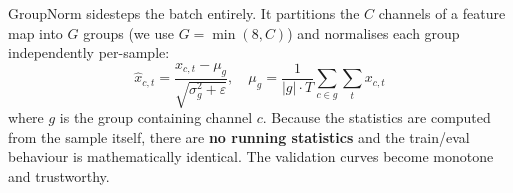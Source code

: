GroupNorm sidesteps the batch entirely. It partitions the $C$ channels of a feature map into $G$ groups (we use $G = \min(8, C)$) and normalises each group independently per-sample:
\begin{equation}
    \hat{x}_{c,t} = \frac{x_{c,t} - \mu_{g}}{\sqrt{\sigma_{g}^{2} + \varepsilon}}, \quad
    \mu_{g} = \frac{1}{|g| \cdot T} \sum_{c \in g} \sum_{t} x_{c,t}
\end{equation}
where $g$ is the group containing channel $c$. Because the statistics are computed from the sample itself, there are \textbf{no running statistics} and the train/eval behaviour is mathematically identical. The validation curves become monotone and trustworthy.

\newpage
